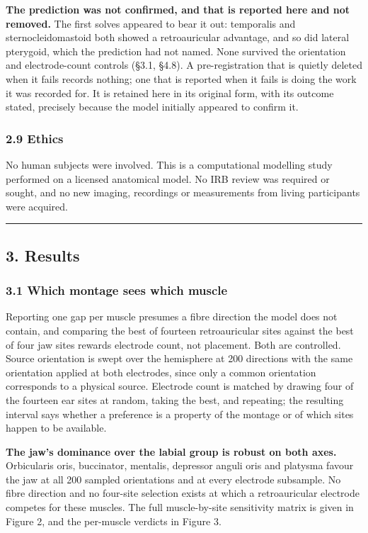 \documentclass[
  11pt,
  letterpaper,
]{article}
\begin{document}
\textbf{The prediction was not confirmed, and that is reported here and not removed.}
The first solves appeared to bear it out: temporalis and sternocleidomastoid
both showed a retroauricular advantage, and so did lateral pterygoid, which the
prediction had not named. None survived the orientation and electrode-count
controls (§3.1, §4.8). A pre-registration that is quietly deleted when it fails
records nothing; one that is reported when it fails is doing the work it was
recorded for. It is retained here in its original form, with its outcome stated,
precisely because the model initially appeared to confirm it.

\subsubsection{2.9 Ethics}\label{ethics}

No human subjects were involved. This is a computational modelling study
performed on a licensed anatomical model. No IRB review was required or sought,
and no new imaging, recordings or measurements from living participants were
acquired.

\begin{center}\rule{0.5\linewidth}{0.5pt}\end{center}

\subsection{3. Results}\label{results}

\subsubsection{3.1 Which montage sees which muscle}\label{which-montage-sees-which-muscle}

Reporting one gap per muscle presumes a fibre direction the model does not
contain, and comparing the best of fourteen retroauricular sites against the
best of four jaw sites rewards electrode count, not placement. Both are
controlled. Source orientation is swept over the hemisphere at 200 directions
with the same orientation applied at both electrodes, since only a common
orientation corresponds to a physical source. Electrode count is matched by
drawing four of the fourteen ear sites at random, taking the best, and
repeating; the resulting interval says whether a preference is a property of
the montage or of which sites happen to be available.

\textbf{The jaw's dominance over the labial group is robust on both axes.}
Orbicularis oris, buccinator, mentalis, depressor anguli oris and platysma
favour the jaw at all 200 sampled orientations and at every electrode
subsample. No fibre direction and no four-site selection exists at which a
retroauricular electrode competes for these muscles. The full muscle-by-site
sensitivity matrix is given in Figure 2, and the per-muscle verdicts in
Figure 3.
\end{document}
